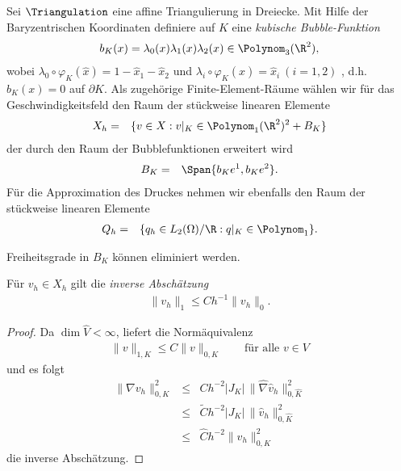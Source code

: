 Sei $\Triangulation$ eine affine Triangulierung in Dreiecke. Mit Hilfe der 
Baryzentrischen Koordinaten definiere auf $K$ eine
\emph{kubische Bubble-Funktion}
\begin{eqnarray*}
    b_K(x) = \lambda_0(x) \lambda_1(x) \lambda_2(x) \in \Polynom_3(\R^2),
\end{eqnarray*}
wobei
$\lambda_0 \circ \varphi_K(\hat x) = 1 - \hat x_1 - \hat x_2$ und $\lambda_i
\circ \varphi_K(\hat x) = \hat x_i \ (i = 1, 2)$
, d.h. $b_K(x) = 0$ auf $\partial K$.
Als zugehörige Finite-Element-Räume wählen wir für das
Geschwindigkeitsfeld den Raum der stückweise linearen Elemente
\begin{eqnarray*}
        X_h
    &=& \{v\in X: v|_K\in \Polynom_1(\R^2)^2 + B_K\}
\end{eqnarray*}
der durch den Raum der Bubblefunktionen erweitert wird 
\begin{eqnarray*}
        B_K
    &=& \Span\{b_K e^1, b_K e^2\}.
\end{eqnarray*}
Für die Approximation des Druckes nehmen wir ebenfalls den Raum der
stückweise linearen Elemente
\begin{eqnarray*}
        Q_h
    &=& \{q_h\in L_2(\Omega) / \R: q|_K\in \Polynom_1\}.
\end{eqnarray*}


\begin{Bemerkung}
    Freiheitsgrade in $B_K$ können eliminiert werden.
\end{Bemerkung}


\begin{Lemma}
    \label{lem:5.13}
    Für $v_h\in X_h$ gilt die \emph{inverse Abschätzung}
    \begin{eqnarray*}
        \|v_h\|_1 \le C h^{-1} \|v_h\|_0.
    \end{eqnarray*}
\end{Lemma}


\begin{proof}
    Da $\dim \hat V < \infty$, liefert die Normäquivalenz
    \begin{eqnarray*}
        \|v\|_{1, K} \le C \|v\|_{0, K}
        \qquad \text{für alle } v\in V
    \end{eqnarray*}
    und es folgt
    \begin{eqnarray*}
              \|\nabla v_h\|_{0, K}^2
        &\le& C h^{-2} |J_K| \, \|\hat \nabla \hat v_h\|_{0, \hat K}^2 \\
        &\le& \tilde C h^{-2} |J_K| \, \|\hat v_h\|_{0, \hat K}^2 \\
        &\le& \hat C h^{-2} \|v_h\|_{0, K}^2
    \end{eqnarray*}
    die inverse Abschätzung.
\end{proof}



